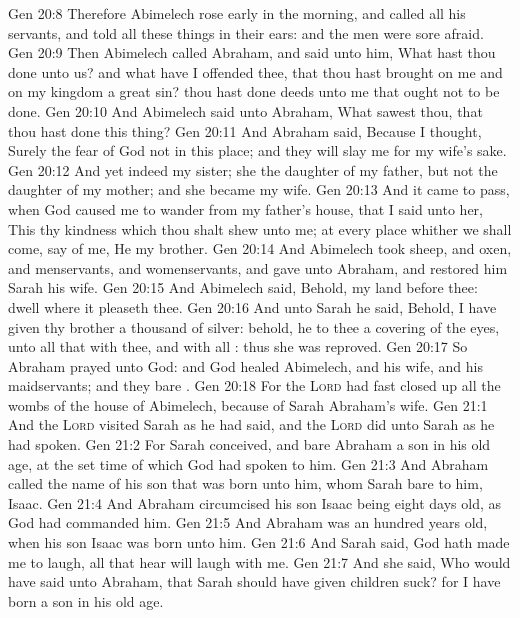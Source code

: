 \vs Gen 20:8 Therefore Abimelech rose early in the morning, and called all his servants, and told all these things in their ears: and the men were sore afraid.
\vs Gen 20:9 Then Abimelech called Abraham, and said unto him, What hast thou done unto us? and what have I offended thee, that thou hast brought on me and on my kingdom a great sin? thou hast done deeds unto me that ought not to be done.
\vs Gen 20:10 And Abimelech said unto Abraham, What sawest thou, that thou hast done this thing?
\vs Gen 20:11 And Abraham said, Because I thought, Surely the fear of God  not in this place; and they will slay me for my wife's sake.
\vs Gen 20:12 And yet indeed  my sister; she  the daughter of my father, but not the daughter of my mother; and she became my wife.
\vs Gen 20:13 And it came to pass, when God caused me to wander from my father's house, that I said unto her, This  thy kindness which thou shalt shew unto me; at every place whither we shall come, say of me, He  my brother.
\vs Gen 20:14 And Abimelech took sheep, and oxen, and menservants, and womenservants, and gave  unto Abraham, and restored him Sarah his wife.
\vs Gen 20:15 And Abimelech said, Behold, my land  before thee: dwell where it pleaseth thee.
\vs Gen 20:16 And unto Sarah he said, Behold, I have given thy brother a thousand  of silver: behold, he  to thee a covering of the eyes, unto all that  with thee, and with all : thus she was reproved.
\vs Gen 20:17 So Abraham prayed unto God: and God healed Abimelech, and his wife, and his maidservants; and they bare .
\vs Gen 20:18 For the \textsc{Lord} had fast closed up all the wombs of the house of Abimelech, because of Sarah Abraham's wife.
\vs Gen 21:1 And the \textsc{Lord} visited Sarah as he had said, and the \textsc{Lord} did unto Sarah as he had spoken.
\vs Gen 21:2 For Sarah conceived, and bare Abraham a son in his old age, at the set time of which God had spoken to him.
\vs Gen 21:3 And Abraham called the name of his son that was born unto him, whom Sarah bare to him, Isaac.
\vs Gen 21:4 And Abraham circumcised his son Isaac being eight days old, as God had commanded him.
\vs Gen 21:5 And Abraham was an hundred years old, when his son Isaac was born unto him.
\vs Gen 21:6 And Sarah said, God hath made me to laugh,  all that hear will laugh with me.
\vs Gen 21:7 And she said, Who would have said unto Abraham, that Sarah should have given children suck? for I have born  a son in his old age.
